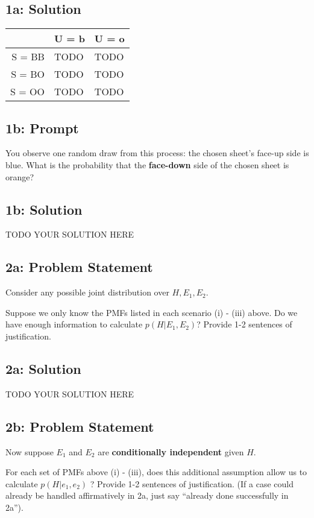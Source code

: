 \documentclass[10pt]{article}
\newcommand{\officialdirections}[1]{{\color{purple} #1}}
\begin{document}
\subsection{1a: Solution}

\begin{tabular}{r | l l}
         &  U = b  & U = o    \\ \hline 
S = BB  &  TODO  & TODO   \\
S = BO  &  TODO  & TODO    \\
S = OO  &  TODO &  TODO
\end{tabular}

\newpage
\officialdirections{
\subsection*{1b: Prompt}
You observe one random draw from this process: the chosen sheet's face-up side is blue.
What is the probability that the \textbf{face-down} side of the chosen sheet is orange?
}

\subsection{1b: Solution}
TODO YOUR SOLUTION HERE

\newpage
\officialdirections{
\subsection*{2a: Problem Statement}
Consider any possible joint distribution over $H, E_1, E_2$.

Suppose we only know the PMFs listed in each scenario (i) - (iii) above. Do we have enough information to calculate $p(H | E_1, E_2)$? Provide 1-2 sentences of justification.
}

\subsection{2a: Solution}
TODO YOUR SOLUTION HERE

\officialdirections{
\subsection*{2b: Problem Statement}
Now suppose $E_1$ and $E_2$ are \textbf{conditionally independent} given $H$.

For each set of PMFs above (i) - (iii), does this additional assumption allow us to calculate $p(H | e_1, e_2)$ ? Provide 1-2 sentences of justification. (If a case could already be handled affirmatively in 2a, just say ``already done successfully in 2a'').
}
\end{document}
